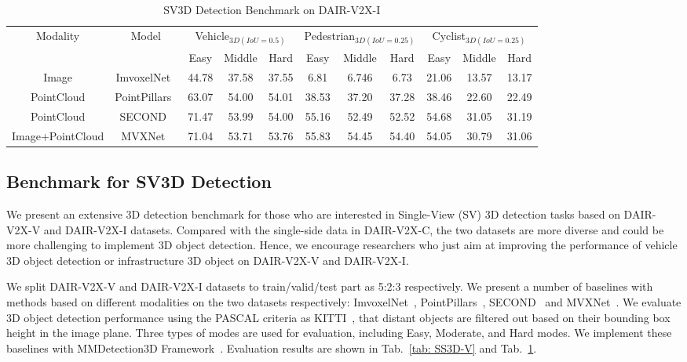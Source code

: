 \begin{table}[htpb!]
\centering
\caption{SV3D Detection Benchmark on DAIR-V2X-I}
\label{tab: SS3D-I}
\small
\begin{tabular}{cc|ccccccccc}
\hline\hline
\multirow{2}{*}{Modality} & 
\multirow{2}{*}{Model} & 
\multicolumn{3}{c}{Vehicle$_{3D(IoU=0.5)}$} & 
\multicolumn{3}{c}{Pedestrian$_{3D(IoU=0.25)}$} & 
\multicolumn{3}{c}{Cyclist$_{3D(IoU=0.25)}$} \\ \cline{3-11} &  
& Easy & \multicolumn{1}{c}{Middle} & \multicolumn{1}{c}{Hard} 
& Easy & \multicolumn{1}{c}{Middle} & \multicolumn{1}{c}{Hard} 
& Easy & \multicolumn{1}{c}{Middle} & \multicolumn{1}{c}{Hard} \\
\hline\hline
Image & ImvoxelNet~\cite{rukhovich2021imvoxelnet} & 44.78 & 37.58 & 37.55 & 6.81 & 6.746 & 6.73 & 21.06 & 13.57 & 13.17 \\
PointCloud & PointPillars~\cite{lang2019pointpillars} & 63.07 & 54.00 & 54.01 & 38.53 & 37.20 & 37.28 & 38.46 & 22.60 & 22.49 \\
PointCloud & SECOND~\cite{yan2018second} & 71.47 & 53.99 & 54.00 & 55.16 & 52.49 & 52.52 & 54.68 & 31.05 & 31.19 \\
Image+PointCloud & MVXNet~\cite{Sindagi2019MVX} & 71.04 & 53.71 & 53.76 & 55.83 & 54.45 & 54.40 & 54.05 & 30.79 & 31.06 \\

\hline\hline
\end{tabular}
\end{table}

\subsection{Benchmark for SV3D Detection}
We present an extensive 3D detection benchmark for those who are interested in Single-View (SV) 3D detection tasks based on DAIR-V2X-V and DAIR-V2X-I datasets. 
Compared with the single-side data in DAIR-V2X-C, the two datasets are more diverse and could be more challenging to implement 3D object detection.
Hence, we encourage researchers who just aim at improving the performance of vehicle 3D object detection or infrastructure 3D object on DAIR-V2X-V and DAIR-V2X-I.

We split DAIR-V2X-V and DAIR-V2X-I datasets to train/valid/test part as 5:2:3 respectively.
We present a number of baselines with methods based on different modalities on the two datasets respectively:
ImvoxelNet~\cite{rukhovich2021imvoxelnet}, PointPillars~\cite{lang2019pointpillars}, SECOND~\cite{yan2018second} and MVXNet~\cite{Sindagi2019MVX}.
We evaluate 3D object detection performance using the PASCAL criteria as KITTI~\cite{Geiger2012KITTI}, that distant objects are filtered out based on their bounding box height in the image plane. Three types of modes are used for evaluation, including Easy, Moderate, and Hard modes.
We implement these baselines with MMDetection3D Framework~\cite{mmdet3d2020}.
Evaluation results are shown in Tab.~\ref{tab: SS3D-V} and Tab.~\ref{tab: SS3D-I}. 

